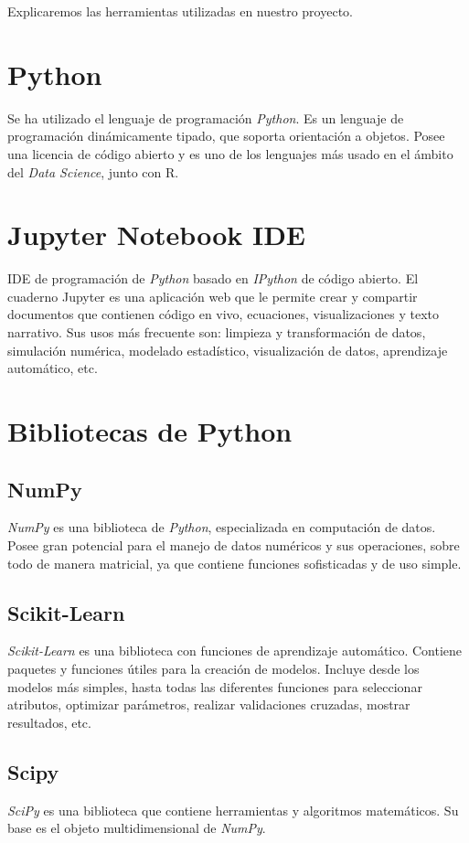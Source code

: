 
Explicaremos las herramientas utilizadas en nuestro proyecto.

\section{Python}
Se ha utilizado el lenguaje de programación \textit{Python}. Es un lenguaje de programación dinámicamente tipado, que soporta orientación a objetos. Posee una licencia de código abierto y es uno de los lenguajes más usado en el ámbito del \textit{Data Science}, junto con R.

\section{Jupyter Notebook IDE}
IDE de programación de \textit{Python} basado en \textit{IPython} de código abierto. El cuaderno Jupyter es una aplicación web que le permite crear y compartir documentos que contienen código en vivo, ecuaciones, visualizaciones y texto narrativo. Sus usos más frecuente son: limpieza y transformación de datos, simulación numérica, modelado estadístico, visualización de datos, aprendizaje automático, etc.

\section{Bibliotecas de Python}
\subsection{NumPy}
\textit{NumPy} \cite{tool:numpy} es una biblioteca de \textit{Python}, especializada en computación de datos. Posee gran potencial para el manejo de datos numéricos y sus operaciones, sobre todo de manera matricial, ya que contiene funciones sofisticadas y de uso simple.

\subsection{Scikit-Learn}
\textit{Scikit-Learn} \cite{tool:scikit-learn} es una biblioteca con funciones de aprendizaje automático. Contiene paquetes y funciones útiles para la creación de modelos. Incluye desde los modelos más simples, hasta todas las diferentes funciones para seleccionar atributos, optimizar parámetros, realizar validaciones cruzadas, mostrar resultados, etc.

\subsection{Scipy}
\textit{SciPy} \cite{tool:scipy} es una biblioteca que contiene herramientas y algoritmos matemáticos. Su base es el objeto multidimensional de \textit{NumPy}.

